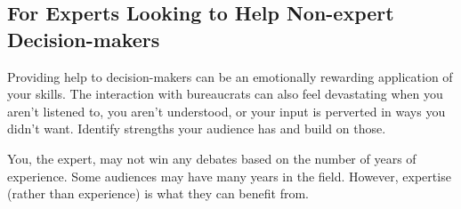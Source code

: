 




\subsection*{For Experts Looking to Help Non-expert Decision-makers}

Providing help to decision-makers can be an emotionally rewarding application of your skills. The interaction with bureaucrats can also feel devastating when you aren't listened to, you aren't understood, or your input is perverted in ways you didn't want. %
Identify strengths your audience has and build on those.








You, the expert, may not win any debates based on the number of years of experience. Some audiences may have many years in the field. However, expertise (rather than experience) is what they can benefit from. 

